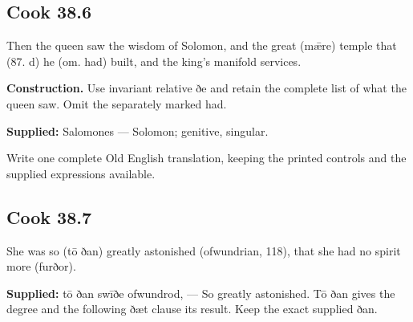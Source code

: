\par\begin{minipage}{\linewidth}\raggedright
\subsection*{Cook 38.6}

Then the queen saw the wisdom of Solomon, and the great (mǣre) temple that (87. d) he (om. had) built, and the king’s manifold services.

\textbf{Construction.} Use invariant relative ðe and retain the complete list of what the queen saw. Omit the separately marked had.

\textbf{Supplied:} Salomones — Solomon; genitive, singular.

Write one complete Old English translation, keeping the printed controls and the supplied expressions available.

\end{minipage}\par\addvspace{4pt}

\par\begin{minipage}{\linewidth}\raggedright
\subsection*{Cook 38.7}

She was so (tō ðan) greatly astonished (ofwundrian, 118), that she had no spirit more (furðor).

\end{minipage}\par\addvspace{4pt}

\textbf{Supplied:} tō ðan swīðe ofwundrod, — So greatly astonished. Tō ðan gives the degree and the following ðæt clause its result. Keep the exact supplied ðan.

